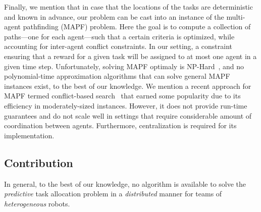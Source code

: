 \documentclass[conference]{IEEEtran}
\def\checkmark{\tikz\fill[scale=0.4](0,.35) -- (.25,0) -- (1,.7) -- (.25,.15) -- cycle;}
\newcommand{\frline}[2]{{\color{blue}#1}{\em \color{blue}[FR]: #2}}
\newcommand{\frline}[2]{#1}
\begin{document}
Finally, we mention that in case that the locations of the tasks are deterministic and known in advance, our problem can be cast into an instance of the multi-agent pathfinding (MAPF) problem\cite{YuLaValle16}. Here the goal is to compute a collection of paths---one for each agent---such that a certain criteria is optimized, while accounting for inter-agent conflict constraints. In our setting, a constraint ensuring that a reward for a given task will be assigned to at most one agent in a given time step. Unfortunately, solving MAPF optimaly is NP-Hard~\cite{yu2013structure}, and no polynomial-time approximation algorithms that can solve general MAPF instances exist, to the best of our knowledge. We mention a recent approach for MAPF termed conflict-based search~\cite{felner2017search,ma2017lifelong,honig2018conflict,liu2019task} that earned some popularity due to its efficiency in moderately-sized instances. However, it does not provide run-time guarantees and do not scale well in settings that require considerable amount of coordination between agents. Furthermore, centralization is required for its  implementation.

\subsection{Contribution}
In general, to the best of our knowledge, no algorithm is available to solve the \emph{predictive} task allocation problem in a \emph{distributed} manner for teams of \emph{heterogeneous} robots.%

\end{document}
